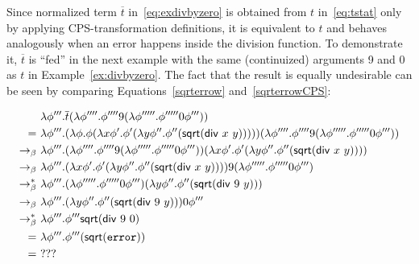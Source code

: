 
Since normalized term $\overline{t}$ in~\eqref{eq:exdivbyzero} is obtained from $t$ in~\eqref{eq:tstat} only by applying CPS-transformation definitions, it is equivalent to $t$  and behaves analogously when an error happens inside the division function. To demonstrate it, $\overline{t}$ is ``fed'' in the next example with the same (continuized) arguments 9 and 0 as $t$ in Example~\ref{ex:divbyzero}. The fact that the result is equally undesirable can be seen by comparing Equations~\eqref{sqrterrow} and~\eqref{sqrterrowCPS}:

\begin{example}
\begin{align}
& \lambda \phi'''. \overline{t} (\lambda \phi''''. \phi'''' 9 (\lambda \phi'''''. \phi''''' 0 \phi''')) \notag \\
 = \ & \lambda \phi'''. (\lambda \phi. \phi ( \lambda x \phi'. \phi' ( \lambda y \phi ''. \phi''  (\mathsf{sqrt} ( \mathsf{div} \ x\ y ))))) (\lambda \phi''''. \phi'''' 9 (\lambda \phi'''''. \phi''''' 0 \phi''')) \notag \\
  \bconv  \ & \lambda \phi'''.  (\lambda \phi''''. \phi'''' 9 (\lambda \phi'''''. \phi''''' 0 \phi''')) ( \lambda x \phi'. \phi' ( \lambda y \phi ''. \phi''  (\mathsf{sqrt} ( \mathsf{div} \ x\ y ))))\notag \\  
    \bconv  \ & \lambda \phi'''.  ( \lambda x \phi'. \phi' ( \lambda y \phi ''. \phi''  (\mathsf{sqrt} ( \mathsf{div} \ x\ y )))) 9 (\lambda \phi'''''. \phi''''' 0 \phi''')\notag \\
     \bred  \ & \lambda \phi'''.   (\lambda \phi'''''. \phi''''' 0 \phi''') ( \lambda y \phi ''. \phi''  (\mathsf{sqrt} ( \mathsf{div} \ 9\ y ))) \notag \\ 
 \bconv  \ & \lambda \phi'''.    ( \lambda y \phi ''. \phi''  (\mathsf{sqrt} ( \mathsf{div} \ 9\ y )))  0 \phi'''\notag \\
\bred \ & \lambda \phi'''. \phi''' \mathsf{sqrt} (\mathsf{div} \ 9 \ 0)  \notag \\
 =  \ & \lambda \phi'''. \phi''' (\mathsf{sqrt} (\mathtt{error} )) \label{sqrterrowCPS}\\
 =   \ & ??? \notag
\end{align}
\end{example}

